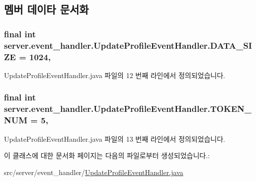 \subsection{멤버 데이타 문서화}
\hypertarget{classserver_1_1event__handler_1_1_update_profile_event_handler_ad0241e6294463e85ab84ee1d7910f891}{
\subsubsection[{D\-A\-T\-A\-\_\-\-S\-I\-Z\-E}]{\setlength{\rightskip}{0pt plus 5cm}final int server.\-event\-\_\-handler.\-Update\-Profile\-Event\-Handler.\-D\-A\-T\-A\-\_\-\-S\-I\-Z\-E = 1024\hspace{0.3cm}{\ttfamily [static]}, {\ttfamily [private]}}}\label{classserver_1_1event__handler_1_1_update_profile_event_handler_ad0241e6294463e85ab84ee1d7910f891}


Update\-Profile\-Event\-Handler.\-java 파일의 12 번째 라인에서 정의되었습니다.

\hypertarget{classserver_1_1event__handler_1_1_update_profile_event_handler_a5af91c4209c042d2e7b251cc33dfa465}{
\subsubsection[{T\-O\-K\-E\-N\-\_\-\-N\-U\-M}]{\setlength{\rightskip}{0pt plus 5cm}final int server.\-event\-\_\-handler.\-Update\-Profile\-Event\-Handler.\-T\-O\-K\-E\-N\-\_\-\-N\-U\-M = 5\hspace{0.3cm}{\ttfamily [static]}, {\ttfamily [private]}}}\label{classserver_1_1event__handler_1_1_update_profile_event_handler_a5af91c4209c042d2e7b251cc33dfa465}


Update\-Profile\-Event\-Handler.\-java 파일의 13 번째 라인에서 정의되었습니다.



이 클래스에 대한 문서화 페이지는 다음의 파일로부터 생성되었습니다.\-:\begin{DoxyCompactItemize}
\item 
src/server/event\-\_\-handler/\hyperlink{_update_profile_event_handler_8java}{Update\-Profile\-Event\-Handler.\-java}\end{DoxyCompactItemize}
